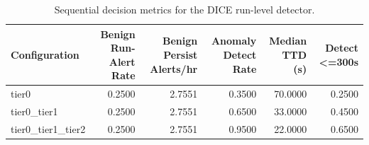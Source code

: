 \begin{table}[t]
\centering
\caption{Sequential decision metrics for the DICE run-level detector.}
\label{tab:dice_sequential_metrics}
\footnotesize
\begin{tabular}{lrrrrr}
\toprule
Configuration & Benign Run-Alert Rate & Benign Persist Alerts/hr & Anomaly Detect Rate & Median TTD (s) & Detect <=300s \\
\midrule
tier0 & 0.2500 & 2.7551 & 0.3500 & 70.0000 & 0.2500 \\
tier0_tier1 & 0.2500 & 2.7551 & 0.6500 & 33.0000 & 0.4500 \\
tier0_tier1_tier2 & 0.2500 & 2.7551 & 0.9500 & 22.0000 & 0.6500 \\
\bottomrule
\end{tabular}

\end{table}
